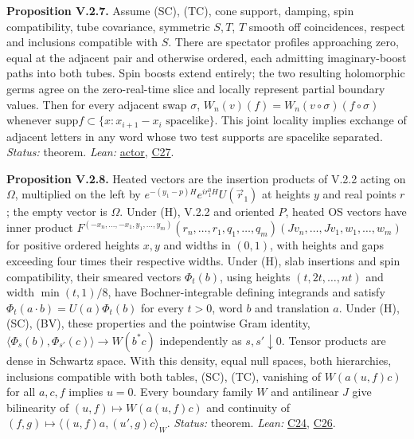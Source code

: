 \documentclass[
  letterpaper,
  11pt]{article}
\begin{document}
\textbf{Proposition V.2.7.} Assume (SC), (TC), cone support, damping,
spin compatibility, tube covariance, symmetric \(S,T\), \(T\) smooth off
coincidences, respect and inclusions compatible with \(S\). There are
spectator profiles approaching zero, equal at the adjacent pair and
otherwise ordered, each admitting imaginary-boost paths into both tubes.
Spin boosts extend entirely; the two resulting holomorphic germs agree
on the zero-real-time slice and locally represent partial boundary
values. Then for every adjacent swap \(\sigma\),
\(W_n(v)(f)=W_n(v\circ\sigma)(f\circ\sigma)\) whenever
\(\mathrm{supp}f\subset\{x:x_{i+1}-x_i\text{ spacelike}\}\). This joint
locality implies exchange of adjacent letters in any word whose two test
supports are spacelike separated. \emph{Status:} theorem. \emph{Lean:}
\href{https://github.com/yang-mills-group/OpenAI-YM-20261028/blob/3456e5e75cf8d4cd558955a5c7638fba2d68f464/YM/Shift/Exchange.lean\#L92-L112}{actor},
\href{https://github.com/yang-mills-group/OpenAI-YM-20261028/blob/3456e5e75cf8d4cd558955a5c7638fba2d68f464/YM/Work/C27.lean\#L87-L92}{C27}.

\textbf{Proposition V.2.8.} Heated vectors are the insertion products of
V.2.2 acting on \(\Omega\), multiplied on the left by
\(e^{-(y_1-p)H}e^{ir_1^0H}U(\vec r_1)\) at heights \(y\) and real points
\(r\); the empty vector is \(\Omega\). Under (H), V.2.2 and oriented
\(P\), heated OS vectors have inner product
\(F^{(-x_n,\ldots,-x_1,y_1,\ldots,y_m)}(r_n,\ldots,r_1,q_1,\ldots,q_m)(Jv_n,\ldots,Jv_1,w_1,\ldots,w_m)\)
for positive ordered heights \(x,y\) and widths in \((0,1)\), with
heights and gaps exceeding four times their respective widths. Under
(H), slab insertions and spin compatibility, their smeared vectors
\(\Phi_t(b)\), using heights \((t,2t,\ldots,nt)\) and width
\(\min(t,1)/8\), have Bochner-integrable defining integrands and satisfy
\(\Phi_t(a\cdot b)=U(a)\Phi_t(b)\) for every \(t>0\), word \(b\) and
translation \(a\). Under (H), (SC), (BV), these properties and the
pointwise Gram identity,
\(\langle\Phi_s(b),\Phi_{s'}(c)\rangle\to W(b^*c)\) independently as
\(s,s'\downarrow0\). Tensor products are dense in Schwartz space. With
this density, equal null spaces, both hierarchies, inclusions compatible
with both tables, (SC), (TC), vanishing of \(W(a(u,f)c)\) for all
\(a,c,f\) implies \(u=0\). Every boundary family \(W\) and antilinear
\(J\) give bilinearity of \((u,f)\mapsto W(a(u,f)c)\) and continuity of
\((f,g)\mapsto\langle(u,f)a,(u\prime,g)c\rangle_W\). \emph{Status:}
theorem. \emph{Lean:}
\href{https://github.com/yang-mills-group/OpenAI-YM-20261028/blob/3456e5e75cf8d4cd558955a5c7638fba2d68f464/YM/Work/C24.lean\#L146-L153}{C24},
\href{https://github.com/yang-mills-group/OpenAI-YM-20261028/blob/3456e5e75cf8d4cd558955a5c7638fba2d68f464/YM/Work/C26.lean\#L77-L92}{C26}.
\end{document}
